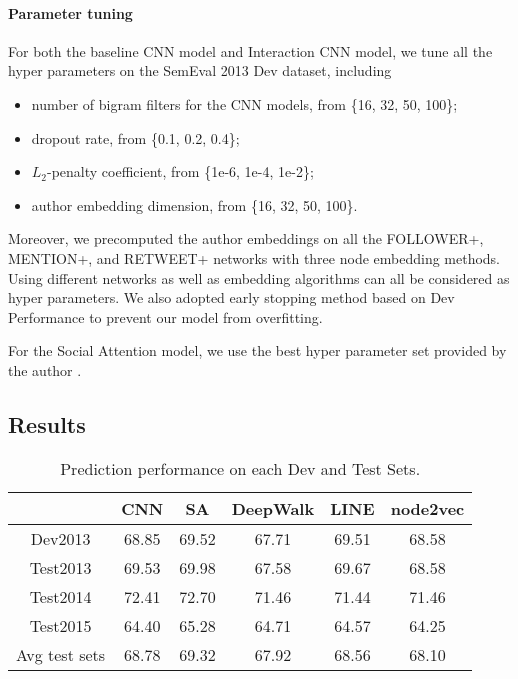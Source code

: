 \paragraph{Parameter tuning} 
For both the baseline CNN model and Interaction CNN model, we tune all the hyper parameters 
on the SemEval 2013 Dev dataset, including
\begin{itemize}
\item number of bigram filters for the CNN models, from \{16, 32, 50, 100\};
\item dropout rate, from \{0.1, 0.2, 0.4\};
\item $L_2$-penalty coefficient, from \{1e-6, 1e-4, 1e-2\};
\item author embedding dimension, from \{16, 32, 50, 100\}.
\end{itemize}
Moreover, we precomputed the author embeddings on all the FOLLOWER+,
MENTION+, and RETWEET+ networks with three node embedding methods. Using different networks
as well as embedding algorithms can all be considered as hyper parameters.
We also adopted early stopping method based on Dev Performance to prevent our model from overfitting.

For the Social Attention model, we use the best hyper parameter set provided by the author \cite{yang2017attention}.


\subsection{Results}
\begin{table}[tbp]
\begin{center}
\begin{tabular}{|c|c| c | c c c |}
\hline
 & CNN & SA
\footnotemark
& DeepWalk & LINE & node2vec\\
\hline
Dev2013  & 68.85 &69.52 & 67.71 & 69.51 & 68.58 \\
\hline
Test2013  & 69.53 & 69.98& 67.58 & 69.67 & 68.58 \\
Test2014  & 72.41 & 72.70 & 71.46 & 71.44 & 71.46 \\
Test2015  & 64.40 &65.28 & 64.71 & 64.57 & 64.25 \\
\hline
Avg test sets & 68.78 &69.32& 67.92 & 68.56  & 68.10 \\
\hline
\end{tabular}
\end{center}
\caption{Prediction performance on each Dev and Test Sets. }
\label{Tb:Results}
\end{table}%



